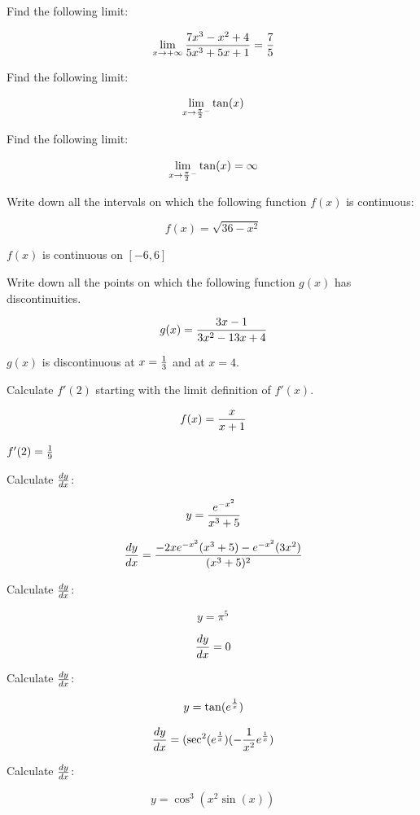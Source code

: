 Find the following limit:

$$\
\lim_{x \to +\infty} {
7x^3 - x^2 + 4
\over
5x^3 + 5x + 1
} = {7 \over 5}
$$

\bigskip

Find the following limit:

$$\
\lim_{x \to {\pi \over 2}^-} {
\tan(x)
}
$$

Find the following limit:

$$\
\lim_{x \to {\pi \over 2}^-} {
\tan(x)
} = \infty
$$

\bigskip

Write down all the intervals on which the following function
$f(x)$ is continuous:

$$\
f(x) = \sqrt{36 - x^2}
$$

$f(x)$ is continuous on $[-6, 6]$
\bigskip

Write down all the points on which the following function
$g(x)$ has discontinuities.

$$\
g(x) = {
3x - 1
\over
3x^2 - 13x + 4
}
$$

$g(x)$ is discontinuous at $x = {1 \over 3}$ and
at $x = 4$.
\bigskip

\problem{PM.1.7}
Calculate $f'(2)$ starting with the limit definition of
$f'(x)$.

$$\
f(x) = {
x
\over
x + 1
}
$$

$f'(2) = {1 \over 9}$
\bigskip

Calculate ${dy \over dx}$:

$$\
y = {
e^{-x^2}
\over
x^3 + 5
}
$$

$$\
{dy \over dx} = {
-2xe^{-x^2}(x^3 + 5) - e^{-x^2}(3x^2)
\over
(x^3 + 5)^2
}
$$
\bigskip

\problem{PM.1.8.2}
Calculate ${dy \over dx}$:

$$\
y = \pi^5
$$

$$\
{dy \over dx} = 0
$$
\bigskip

Calculate ${dy \over dx}$:

$$\
y = \tan(e^{1 \over x})
$$

$$\
{dy \over dx} =
(\sec^2(e^{1 \over x})(- {1 \over x^2} e^{1 \over x})
$$
\bigskip

Calculate ${dy \over dx}$:

$$\
y = \cos^3(x^2 \sin(x))
$$

